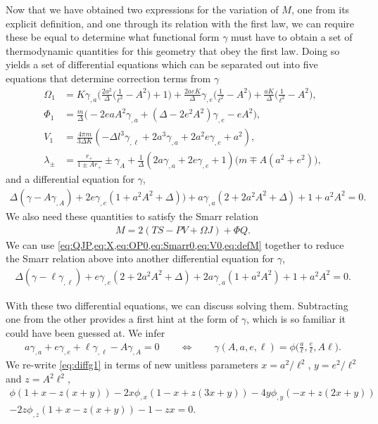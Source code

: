 \documentclass[
twoside,openright,frontopenright]{dmathesis}
\newcommand{\nn}{\nonumber}
\begin{document}
Now that we have obtained two expressions for the variation of $M$, one from its
explicit definition, and one through its relation with the first law, we can
require these be equal to determine what functional form $\gamma$ must have to
obtain a set of thermodynamic quantities for this geometry that obey the first
law.  Doing so yields a set of differential equations which can be separated out
into five equations that determine correction terms from $\gamma$
\begin{align}
\Omega_1 &= K \gamma_{,a} \bigg(\frac{2 a^2}{\Delta} \Big(\frac{1}{\ell^2}-A^2\Big)+1\bigg) + \frac{2 a e K}{\Delta}\gamma_{,e} \Big(\frac{1}{\ell^2}-A^2\Big)+\frac{a K}{\Delta} \Big(\frac{1}{\ell^2}-A^2 \Big),\nn\\
\Phi_1 &= \frac{m}{\Delta}\Big(-2 e a A^2\gamma_{,a}+(\Delta-2 e^2 A^2)\gamma_{,e}-eA^2\Big) ,\nn\\
V_1 &= \frac{4 \pi  m }{3 \Delta K}(-\Delta l^3 \gamma_{,\ell}+2 a^3 \gamma_{,a}+2 a^2 e \gamma_{,e}+a^2),\nn\\
\lambda_\pm &= \frac{r_+}{1\pm Ar_+}\pm \gamma_{A} + \frac{1}{\Delta}(2a\gamma_{,a} + 2e \gamma_{,e} + 1)\big(m\mp A(a^2+e^2)\big) ,
\label{eq:corrTermsWithGamma}
\end{align}
and a differential equation for $\gamma$, 
\begin{align}\label{eq:diffg1}
\Delta(\gamma-A\gamma_{,A})+2e\gamma_{,e}(1+a^2A^2+\Delta))+a\gamma_{,a}(2+2a^2A^2+\Delta)+1+a^2A^2=0.
\end{align}
We also need these quantities to satisfy the Smarr relation
\begin{align}
M=2(TS-PV+\Omega J) + \Phi Q.
\end{align}
We can use \cref{eq:QJP,eq:X,eq:OP0,eq:Smarr0,eq:V0,eq:defM} together to reduce
the Smarr relation above into another differential equation for $\gamma$, 
\begin{align}\label{eq:diffg2}
\Delta(\gamma - \ell\gamma_{,\ell}) + e\gamma_{,e}(2+2a^2A^2+\Delta)+2a\gamma_{,a}(1+a^2A^2)+1+a^2A^2 = 0.
\end{align}

With these two differential equations, we can discuss solving them. Subtracting
one from the other provides a first hint at the form of $\gamma$, which is so
familiar it could have been guessed at. We infer 
\begin{align}
a\gamma_{,a} + e\gamma_{,e} + \ell\gamma_{,\ell} - A \gamma_{,A} = 0 \qquad \Longleftrightarrow \qquad \gamma(A,a,e,\ell) = \phi\Big(\frac{a}{\ell}, \frac{e}{\ell}, A\ell\Big).
\end{align}
We re-write \cref{eq:diffg1} in terms of new unitless parameters $x=
a^2/\ell^2$, $y=e^2/\ell^2$ and $z=A^2\ell^2$, 
\begin{multline}
\phi(1+x-z(x+y))-2x \phi_{,x}(1-x+z(3x+y))-4y\phi_{,y}(-x+z(2x+y))\\-2z\phi_{,z}(1+x-z(x+y))-1-zx=0.
\end{multline}
\end{document}
